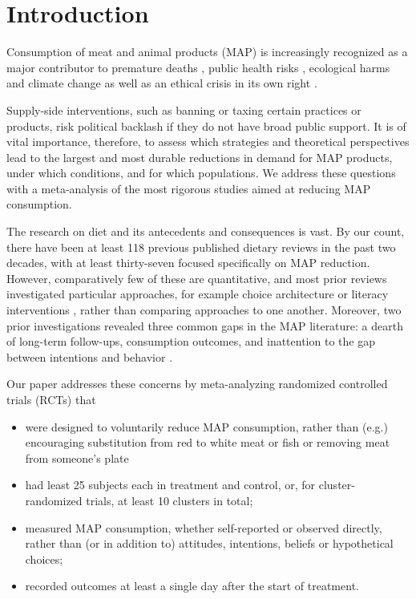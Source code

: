 \documentclass[sn-nature,pdflatex]{sn-jnl}
\begin{document}



\maketitle

\section{Introduction}\label{sec1}

Consumption of meat and animal products (MAP) is increasingly recognized
as a major contributor to premature deaths
\citep{willett2019, landry2023}, public health risks
\citep{slingenbergh2004, graham2008}, ecological harms
\citep{greger2010} and climate change
\citep{scarborough2023, koneswaran2008} as well as an ethical crisis in
its own right \citep{kuruc2023, singer2023}.

Supply-side interventions, such as banning or taxing certain practices
or products, risk political backlash if they do not have broad public
support. It is of vital importance, therefore, to assess which
strategies and theoretical perspectives lead to the largest and most
durable reductions in demand for MAP products, under which conditions,
and for which populations. We address these questions with a
meta-analysis of the most rigorous studies aimed at reducing MAP
consumption.

The research on diet and its antecedents and consequences is vast. By
our count, there have been at least 118 previous published dietary
reviews in the past two decades, with at least thirty-seven focused
specifically on MAP reduction. However, comparatively few of these are
quantitative, and most prior reviews investigated particular approaches,
for example choice architecture \citep{bianchi2018restructuring} or
literacy interventions \citep{DiGennaro2024}, rather than comparing
approaches to one another. Moreover, two prior investigations revealed
three common gaps in the MAP literature: a dearth of long-term
follow-ups, consumption outcomes, and inattention to the gap between
intentions and behavior \citep{mathur2021meta, mathur2021effectiveness}.

Our paper addresses these concerns by meta-analyzing randomized
controlled trials (RCTs) that

\begin{itemize}
\item
  were designed to voluntarily reduce MAP consumption, rather than
  (e.g.) encouraging substitution from red to white meat or fish or
  removing meat from someone's plate
\item
  had least 25 subjects each in treatment and control, or, for
  cluster-randomized trials, at least 10 clusters in total;
\item
  measured MAP consumption, whether self-reported or observed directly,
  rather than (or in addition to) attitudes, intentions, beliefs or
  hypothetical choices;
\item
  recorded outcomes at least a single day after the start of treatment.
\end{itemize}
\end{document}

